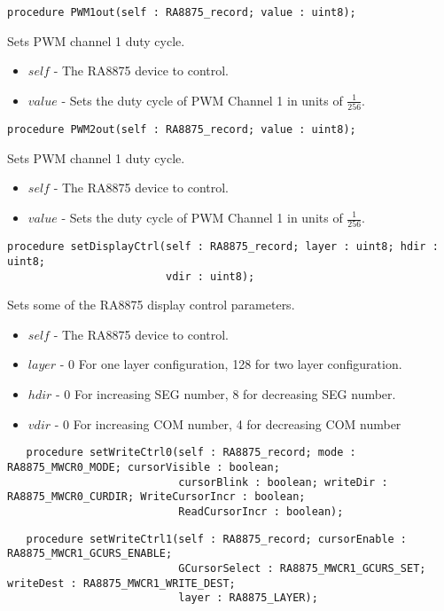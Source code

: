 \documentclass[10pt, openany]{book}
\begin{document}
\begin{lstlisting}
procedure PWM1out(self : RA8875_record; value : uint8);
\end{lstlisting}
Sets PWM channel 1 duty cycle.
\begin{itemize}
  \item $self$ - The RA8875 device to control.
  \item $value$ - Sets the duty cycle of PWM Channel 1 in units of $\frac{1}{256}$.
\end{itemize}

\begin{lstlisting}
procedure PWM2out(self : RA8875_record; value : uint8);
\end{lstlisting}
Sets PWM channel 1 duty cycle.
\begin{itemize}
  \item $self$ - The RA8875 device to control.
  \item $value$ - Sets the duty cycle of PWM Channel 1 in units of $\frac{1}{256}$.
\end{itemize}

\begin{lstlisting}
procedure setDisplayCtrl(self : RA8875_record; layer : uint8; hdir : uint8;
                         vdir : uint8);
\end{lstlisting}
Sets some of the RA8875 display control parameters.
\begin{itemize}
  \item $self$ - The RA8875 device to control.
  \item $layer$ - 0 For one layer configuration, 128 for two layer configuration.
  \item $hdir$ - 0 For increasing SEG number, 8 for decreasing SEG number.
  \item $vdir$ - 0 For increasing COM number, 4 for decreasing COM number
\end{itemize}

\begin{lstlisting}
   procedure setWriteCtrl0(self : RA8875_record; mode : RA8875_MWCR0_MODE; cursorVisible : boolean;
                           cursorBlink : boolean; writeDir : RA8875_MWCR0_CURDIR; WriteCursorIncr : boolean;
                           ReadCursorIncr : boolean);
\end{lstlisting}
\begin{lstlisting}
   procedure setWriteCtrl1(self : RA8875_record; cursorEnable : RA8875_MWCR1_GCURS_ENABLE;
                           GCursorSelect : RA8875_MWCR1_GCURS_SET; writeDest : RA8875_MWCR1_WRITE_DEST;
                           layer : RA8875_LAYER);
\end{lstlisting}
\end{document}

